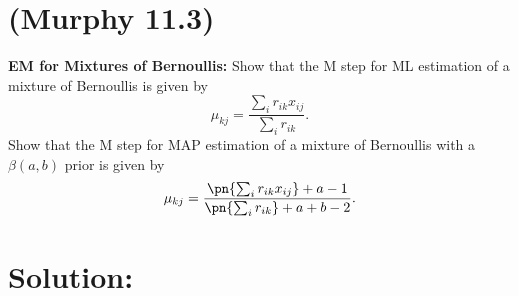 \documentclass[189]{pset}
\begin{document}

  \section{(Murphy 11.3)}
  \textbf{EM for Mixtures of Bernoullis:}
  Show that the M step for ML estimation of a mixture of Bernoullis is
  given by
  \[
    \mu_{kj} = \frac{\sum_i r_{ik}x_{ij}}{\sum_i r_{ik}}.
  \]
  Show that the M step for MAP estimation of a mixture of Bernoullis
  with a $\beta(a,b)$ prior is given by
  \[
    \mu_{kj} = \frac{\pn{\sum_i r_{ik}x_{ij}} + a - 1}{\pn{\sum_i
        r_{ik}} + a + b - 2}.
  \]
  \hrulefill

  \section*{Solution:}
\end{document}
